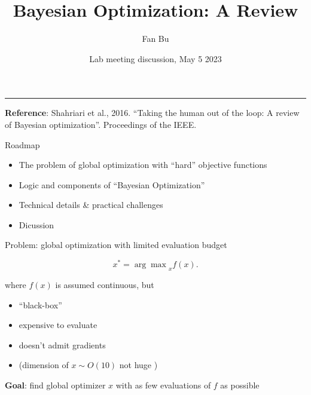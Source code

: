 \documentclass[aspectratio=169]{beamer}					%
\title{Bayesian Optimization: A Review}	%
\author{Fan Bu}			%
\institute{}					%
\date{Lab meeting discussion, May 5 2023}
\begin{document}
\begin{frame}
  \titlepage
  
  \vfill
  \rule{0.6\textwidth}{0.4pt}
  
  \footnotesize{
  	\textbf{Reference}: Shahriari et al., 2016. ``Taking the human out of the loop: A review of Bayesian optimization''.  Proceedings of the IEEE.  
  }
\end{frame}




\begin{frame}{Roadmap}

\begin{itemize}
    \item The problem of global optimization with ``hard'' objective functions
    \item Logic and components of ``Bayesian Optimization''
    \item Technical details \& practical challenges
    \item Dicussion
\end{itemize}

\end{frame}

\begin{frame}{Problem: global optimization with limited evaluation budget}
	
	\begin{equation*}
		x^* = {\arg \max}_{x} f(x).
	\end{equation*}
\vspace{.5em}
	
	where $f(x)$ is assumed continuous, but
	\begin{itemize}
		\item ``black-box''
		\item expensive to evaluate
		\item doesn't admit gradients
		\item (dimension of $x \sim O(10)$ not huge \cite{frazier2018tutorial})
	\end{itemize}
	
	\pause 
	\vspace{.5em}
	
	
	\textbf{Goal}: find global optimizer $x$ with as few evaluations of $f$ as possible
	
\end{frame}
\end{document}
